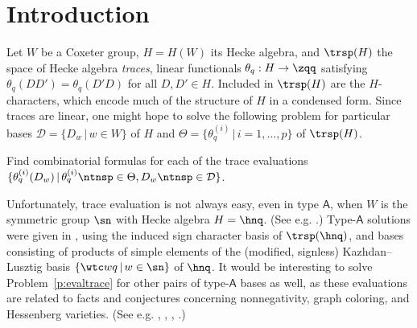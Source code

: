 \newcommand{\precdot}{\prec \negthickspace \negthinspace \cdot\ }
\newcommand{\net}[2]{\mathcal F^{\mathsf{#1}}(#2)}
\newcommand{\snet}[2]{\mathcal S^{\mathsf{#1}}(#2)}
\newcommand{\znet}[2]{\mathcal S^{\mathsf{#1}}_{\mathrm Z}(#2)}
\newcommand{\dnet}[2]{\mathcal S^{\mathsf{#1}}_{\mathrm D}(#2)}
\newcommand{\sfA}{\textsf{A}}
\newcommand{\msfA}{\mathsf{A}}
\newcommand{\sfBB}{\textsf{B}}
\newcommand{\msfBB}{\mathsf{B}}
\newcommand{\sfC}{\textsf{C}}
\newcommand{\msfC}{\mathsf{C}}
\newcommand{\sfBC}{\textsf{BC}}
\newcommand{\msfBC}{\mathsf{BC}}
\newcommand{\YBCq}{Y_q^\mathsf{BC}}
\newcommand{\vertex}[1]{#1}
\newcommand{\phsum}{\phantom{\sum_A^Z}}
\newcommand{\phm}{\phantom M}
\newcommand{\phn}{\phantom{ni}}
\newcommand{\bcao}[1]{\mathcal{O}^{\msfBC}({#1})}
\newcommand{\schub}[1]{\Omega_{#1}}
\newcommand{\Aschub}[1]{\Omega_{#1}^{\msfA}}
\newcommand{\Bschub}[1]{\Omega_{#1}^{\msfBB}}
\newcommand{\Cschub}[1]{\Omega_{#1}^{\msfC}}
\newcommand{\tripprox}{\setbox0\hbox{$\approx$}%
\mbox{\makebox[0pt][l]{\raisebox{0.48\ht0}{$\approx$}}$\approx$}}
\newcommand*{\diffeo}{%
  \mathrel{\vcenter{\offinterlineskip
  \hbox{$\sim$}\vskip-.35ex\hbox{$\sim$}\vskip-.35ex\hbox{$\sim$}}}}

\theoremstyle{remark}

\section{Introduction}\label{s:intro}

Let $W$ be a Coxeter group, $H = H(W)$ its Hecke algebra, and $\trsp(H)$ the
space of Hecke algebra {\em traces},
linear functionals $\theta_q: H \rightarrow \zqq$ satisfying
$\theta_q(DD') = \theta_q(D'D)$ for all $D, D' \in H$.
Included in $\trsp(H)$ are the $H$-characters,
which encode much of the structure of $H$ in a condensed form.
Since traces are linear,
one might hope to solve the
following problem for particular bases
$\mathcal D = \{ D_w \,|\, w \in W \}$ of $H$
and $\Theta = \{ \theta_q^{(i)} \,|\, i = 1,\dotsc,p \}$
of $\trsp(H)$.
\begin{prob}\label{p:evaltrace}
  Find combinatorial formulas for
  each of the trace evaluations
$\{ \theta_q^{(i)} (D_w) \,|\,
\theta_q^{(i)} \ntnsp\in \Theta, D_w \ntnsp\in \mathcal D\}$.
\end{prob}

Unfortunately, trace evaluation is not always easy,
even in type $\msfA$,
when $W$ is the symmetric group $\sn$ with Hecke algebra $H = \hnq$.
(See e.g. \cite[\S 1]{CHSSkanEKL}.)
Type-$\msfA$ solutions were given in
\cite{CSkanTNNChar, KLSBasesQMBIndSgn},
using the induced sign character basis of $\trsp(\hnq)$,
and bases consisting of products of simple elements of
the (modified, signless) Kazhdan--Lusztig basis
$\{ \wtc wq \,|\, w \in \sn \}$ of $\hnq$.
It would be interesting to solve Problem~\ref{p:evaltrace}
for other pairs of type-$\msfA$ bases as well, as these evaluations are related to
facts and conjectures
concerning nonnegativity,
graph coloring, and Hessenberg varieties. (See e.g.
\cite[Lem.\,1.1]{HaimanHecke},
\cite[Conj.\,2.1]{HaimanHecke},  
\cite[Conj.\,4.9]{SWachsChromQ},
\cite[Conj.\,5.5]{StanStemIJT}.)

